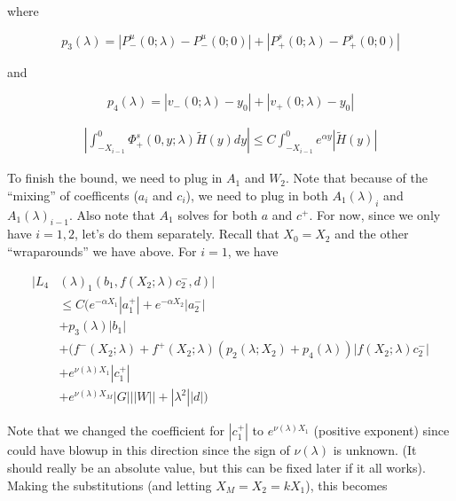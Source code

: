 \documentclass[12pt]{article}
\begin{document}
\begin{enumerate}
where

\[
p_3(\lambda) = |P^u_-(0;\lambda) - P^u_-(0; 0)| + |P^s_+(0;\lambda) - P^s_+(0;0)|
\]

and

\[
p_4(\lambda) = |v_-(0; \lambda) - y_0| + |v_+(0; \lambda) - y_0|
\]

\begin{align*}
\left| \int_{-X_{i-1}}^0 \Phi^s_+(0, y; \lambda) \tilde{H}(y) dy \right| 
\leq C \int_{-X_{i-1}}^0 e^{\alpha y}|\tilde{H}(y)|
\end{align*}

To finish the bound, we need to plug in $A_1$ and $W_2$. Note that because of the ``mixing'' of coefficents ($a_i$ and $c_i$), we need to plug in both $A_1(\lambda)_i$ and $A_1(\lambda)_{i-1}$. Also note that $A_1$ solves for both $a$ and $c^+$. For now, since we only have $i = 1, 2$, let's do them separately. Recall that $X_0 = X_2$ and the other ``wraparounds'' we have above. For $i = 1$, we have

\begin{align*}
|L_4&(\lambda)_1(b_1, f(X_2; \lambda) c_2^-, d)|\\ 
&\leq C( e^{-\alpha X_1} |a_1^+| + e^{-\alpha X_2} |a_2^-| \\
&+ p_3(\lambda) |b_1| \\
&+ (f^-(X_2; \lambda) + f^+(X_2; \lambda) (p_2(\lambda; X_2) + p_4(\lambda)) | f(X_2; \lambda) c_2^-| \\
&+ e^{\nu(\lambda)X_1} |c_1^+| \\
&+ e^{\nu(\lambda)X_M}|G| ||W|| + |\lambda^2||d|)
\end{align*}

Note that we changed the coefficient for $|c_1^+|$ to $e^{\nu(\lambda)X_1}$ (positive exponent) since could have blowup in this direction since the sign of $\nu(\lambda)$ is unknown. (It should really be an absolute value, but this can be fixed later if it all works). Making the substitutions (and letting $X_M = X_2 = k X_1$), this becomes


\end{enumerate}
\end{document}

